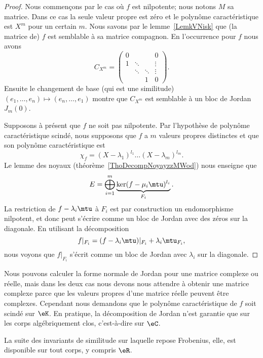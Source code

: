 \begin{proof}
    Nous commençons par le cas où \( f\) est nilpotente; nous notons \( M\) sa matrice. Dans ce cas la seule valeur propre est zéro et le polynôme caractéristique est \( X^m\) pour un certain \( m\). Nous savons par le lemme~\ref{LemkVNisk} que (la matrice de) \( f\) est semblable à sa matrice compagnon. En l'occurrence pour \( f\) nous avons
    \begin{equation}
        C_{X^m}=\begin{pmatrix}
             0   &       &       &  0     \\
             1   &   \ddots    &       &   \vdots    \\
                &   \ddots    &   \ddots    &    \vdots   \\
                &       &   1    &   0
         \end{pmatrix}.
    \end{equation}
    Ensuite le changement de base (qui est une similitude) \( (e_1,\ldots, e_n)\mapsto(e_n,\ldots, e_1)\) montre que \( C_{X^m}\) est semblable à un bloc de Jordan \( J_m(0)\).

    Supposons à présent que \( f\) ne soit pas nilpotente. Par l'hypothèse de polynôme caractéristique scindé, nous supposons que \( f\) a \( m\) valeurs propres distinctes et que son polynôme caractéristique est
    \begin{equation}
        \chi_f=(X-\lambda_1)^{l_1}\ldots (X-\lambda_m)^{l_m}.
    \end{equation}
    Le lemme des noyaux (théorème~\ref{ThoDecompNoyayzzMWod}) nous enseigne que
    \begin{equation}
        E=\bigoplus_{i=1}^m\underbrace{\ker(f-\mu_i\mtu)^{l_i}}_{F_i}.
    \end{equation}
    La restriction de \( f-\lambda_i\mtu\) à \( F_i\) est par construction un endomorphisme nilpotent, et donc peut s'écrire comme un bloc de Jordan avec des zéros sur la diagonale. En utilisant la décomposition
    \begin{equation}
        f|_{F_i}=(f-\lambda_i\mtu)|_{F_i}+\lambda_i\mtu_{F_i},
    \end{equation}
    nous voyons que \( f|_{F_i}\) s'écrit comme un bloc de Jordan avec \( \lambda_i\) sur la diagonale.
\end{proof}

\begin{remark}
    Nous pouvons calculer la forme normale de Jordan pour une matrice complexe ou réelle, mais dans les deux cas nous devons nous attendre à obtenir une matrice complexe parce que les valeurs propres d'une matrice réelle peuvent être complexes. Cependant nous demandons que le polynôme caractéristique de \( f\) soit scindé sur \( \eK\). En pratique, la décomposition de Jordan n'est garantie que sur les corps algébriquement clos, c'est-à-dire sur \( \eC\).

    La suite des invariants de similitude sur laquelle repose Frobenius, elle, est disponible sur tout corps, y compris \( \eR\).
\end{remark}

